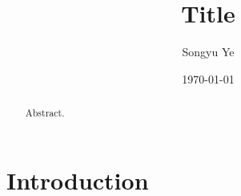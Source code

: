 \documentclass[12pt]{article}
\title{Title}
\author{Songyu Ye}
\date{\today}
\begin{document}
\notestitle

\begin{abstract}
Abstract.
\end{abstract}

\tableofcontents
\section{Introduction}
\end{document}
